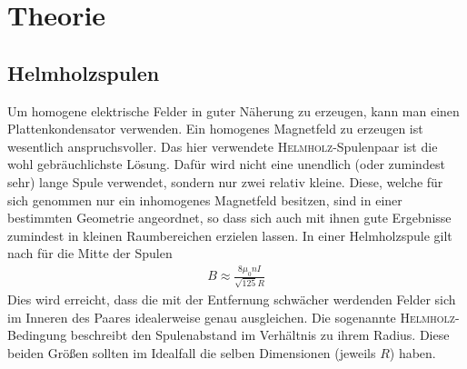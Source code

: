 \documentclass[12pt,a4paper,titlepage,headinclude,bibtotoc]{scrartcl}
\numberwithin{equation}{section}
\begin{document}
\section{Theorie}
\label{sec:theorie}


\subsection{Helmholzspulen}
Um homogene elektrische Felder in guter Näherung zu erzeugen, kann man einen Plattenkondensator verwenden.
Ein homogenes Magnetfeld zu erzeugen ist wesentlich anspruchsvoller. 
Das hier verwendete \textsc{Helmholz}-Spulenpaar ist die wohl gebräuchlichste Lösung.
Dafür wird nicht eine unendlich (oder zumindest sehr) lange Spule verwendet, sondern nur zwei relativ kleine.
Diese, welche für sich genommen nur ein inhomogenes Magnetfeld besitzen, sind in einer bestimmten Geometrie angeordnet, so dass sich auch mit ihnen gute Ergebnisse zumindest in kleinen Raumbereichen erzielen lassen.
In einer Helmholzspule gilt nach \cite[S. 94, Gleichung 3.22c]{demtroeder2} für die Mitte der Spulen
\begin{align}
	B\approx\frac{8\mu_0nI}{\sqrt{125}R}\label{eq:BHelm}
\end{align}
Dies wird erreicht, dass die mit der Entfernung schwächer werdenden Felder sich im Inneren des Paares idealerweise genau ausgleichen.
Die sogenannte \textsc{Helmholz}-Bedingung beschreibt den Spulenabstand im Verhältnis zu ihrem Radius.
Diese beiden Größen sollten im Idealfall die selben Dimensionen (jeweils $R$) haben.\\
\end{document}
